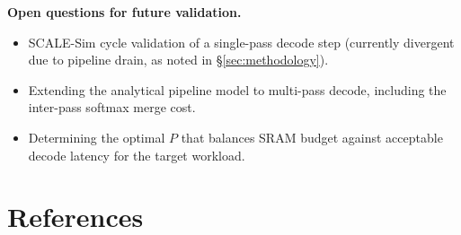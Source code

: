 \documentclass[11pt]{article}
\begin{document}
\textbf{Open questions for future validation.}
\begin{itemize}[noitemsep]
    \item SCALE-Sim cycle validation of a single-pass decode step
          (currently divergent due to pipeline drain, as noted in \S\ref{sec:methodology}).
    \item Extending the analytical pipeline model to multi-pass decode,
          including the inter-pass softmax merge cost.
    \item Determining the optimal \(P\) that balances SRAM budget
          against acceptable decode latency for the target workload.
\end{itemize}

\section{References}

\printbibliography[heading=none]
\end{document}
